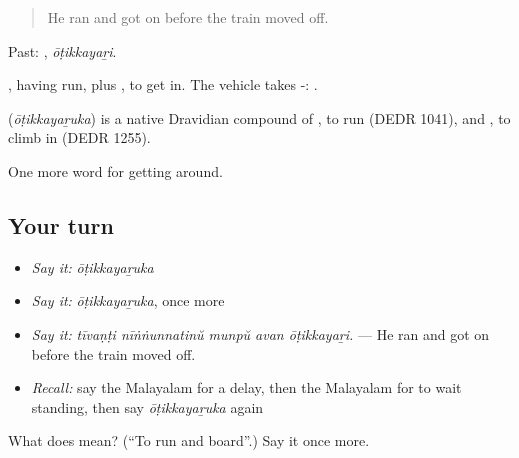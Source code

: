 \begin{quote}
He ran and got on before the train moved off.
\end{quote}

Past: , \emph{ōṭikkayaṟi}.

, having run, plus , to get in. The vehicle takes -:  .

\begin{cousinweb}
\textbf{} (\emph{ōṭikkayaṟuka}) is a native Dravidian compound of , to run (DEDR 1041), and , to climb in (DEDR 1255).
\end{cousinweb}

\begin{grammarlens}[title={What you've built}]
One more word for getting around.
\end{grammarlens}

\subsection*{Your turn}
\begin{itemize}
\raggedright
  \item \emph{Say it:} \emph{ōṭikkayaṟuka}
  \item \emph{Say it:} \emph{ōṭikkayaṟuka}, once more
  \item \emph{Say it:} \emph{tīvaṇṭi nīṅṅunnatinŭ munpŭ avan ōṭikkayaṟi.} — He ran and got on before the train moved off.
  \item \emph{Recall:} say the Malayalam for a delay, then the Malayalam for to wait standing, then say \emph{ōṭikkayaṟuka} again
\end{itemize}

\begin{tcolorbox}[breakable,colback=teal!4,colframe=teal!35!black,title={Before you move on}]
What does  mean? (\textquotedblleft{}To run and board\textquotedblright{}.) Say it once more.
\end{tcolorbox}
